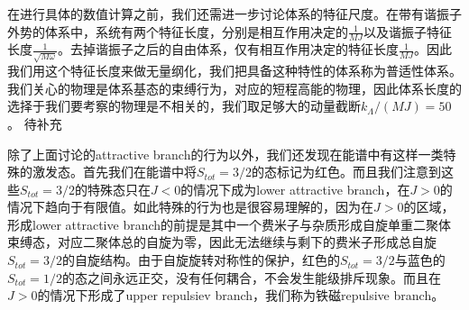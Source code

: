 在进行具体的数值计算之前，我们还需进一步讨论体系的特征尺度。在带有谐振子外势的体系中，系统有两个特征长度，分别是相互作用决定的$\frac{1}{MJ}$以及谐振子特征长度$\frac{1}{\sqrt{M\omega}}$。去掉谐振子之后的自由体系，仅有相互作用决定的特征长度$\frac{1}{MJ}$。因此我们用这个特征长度来做无量纲化，我们把具备这种特性的体系称为普适性体系。我们关心的物理是体系基态的束缚行为，对应的短程高能的物理，因此体系长度的选择于我们要考察的物理是不相关的，我们取足够大的动量截断$k_{\Lambda}/(MJ)=50$。{\color{red} 待补充 }

除了上面讨论的attractive branch的行为以外，我们还发现在能谱中有这样一类特殊的激发态。首先我们在能谱中将$S_{tot}=3/2$的态标记为红色。而且我们注意到这些$S_{tot}=3/2$的特殊态只在$J<0$的情况下成为lower attractive branch，在$J>0$的情况下趋向于有限值。如此特殊的行为也是很容易理解的，因为在$J>0$的区域，形成lower attractive branch的前提是其中一个费米子与杂质形成自旋单重二聚体束缚态，对应二聚体总的自旋为零，因此无法继续与剩下的费米子形成总自旋$S_{tot}=3/2$的自旋结构。由于自旋旋转对称性的保护，红色的$S_{tot}=3/2$与蓝色的$S_{tot}=1/2$的态之间永远正交，没有任何耦合，不会发生能级排斥现象。而且在$J>0$的情况下形成了upper repulsiev branch，我们称为铁磁repulsive branch。

